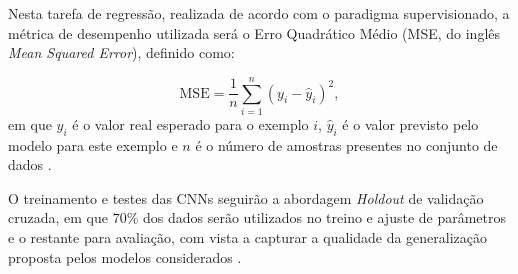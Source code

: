 Nesta tarefa de regressão, realizada de acordo com o paradigma supervisionado, a métrica de desempenho utilizada será o Erro Quadrático Médio (MSE, do inglês \emph{Mean Squared Error}), definido como:

\begin{equation}
\textrm{MSE} = \frac{1}{n}\sum_{i=1}^n (y_i - \hat{y}_i)^{2}, \label{eq:mse}
\end{equation} em que $y_i$ é o valor real esperado para o exemplo $i$, $\hat{y}_i$ é o valor previsto pelo modelo para este exemplo e $n$ é o número de amostras presentes no conjunto de dados \cite{ref:faceli}.

O treinamento e testes das CNNs seguirão a abordagem \emph{Holdout} de validação cruzada, em que $70\%$ dos dados serão utilizados no treino e ajuste de parâmetros e o restante para avaliação, com vista a capturar a qualidade da generalização proposta pelos modelos considerados \cite{ref:brink}.
